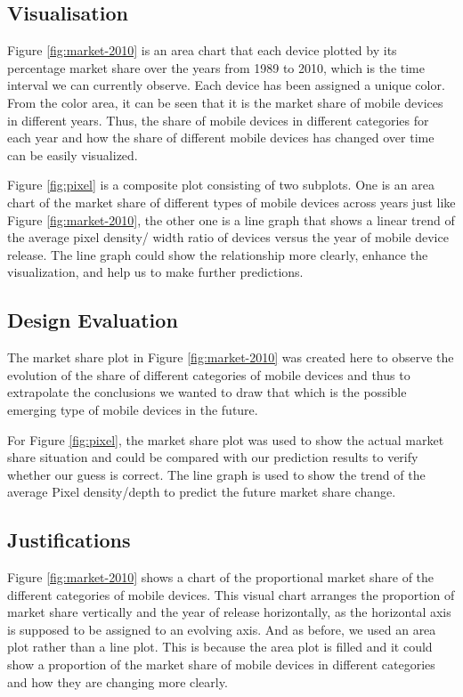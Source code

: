 \documentclass[conference]{IEEEtran}
\begin{document}
\subsection{Visualisation}
Figure \ref{fig:market-2010} is an area chart that each device plotted by its percentage market share over the years from 1989 to 2010, which is the time interval we can currently observe. Each device has been assigned a unique color. From the color area, it can be seen that it is the market share of mobile devices in different years. Thus, the share of mobile devices in different categories for each year and how the share of different mobile devices has changed over time can be easily visualized.

Figure \ref{fig:pixel} is a composite plot consisting of two subplots. One is an area chart of the market share of different types of mobile devices across years just like Figure \ref{fig:market-2010}, the other one is a line graph that shows a linear trend of the average pixel density/ width ratio of devices versus the year of mobile device release. The line graph could show the relationship more clearly, enhance the visualization, and help us to make further predictions.

\subsection{Design Evaluation}
The market share plot in Figure \ref{fig:market-2010} was created here to observe the evolution of the share of different categories of mobile devices and thus to extrapolate the conclusions we wanted to draw that which is the possible emerging type of mobile devices in the future.

For Figure \ref{fig:pixel}, the market share plot was used to show the actual market share situation and could be compared with our prediction results to verify whether our guess is correct. The line graph is used to show the trend of the average Pixel density/depth to predict the future market share change.

\subsection{Justifications}
Figure \ref{fig:market-2010} shows a chart of the proportional market share of the different categories of mobile devices. This visual chart arranges the proportion of market share vertically and the year of release horizontally, as the horizontal axis is supposed to be assigned to an evolving axis. And as before, we used an area plot rather than a line plot. This is because the area plot is filled and it could show a proportion of the market share of mobile devices in different categories and how they are changing more clearly. 
\end{document}
